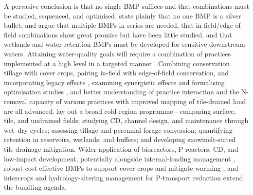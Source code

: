 A pervasive conclusion is that no single BMP suffices and that combinations must be studied, sequenced, and optimised. \textcite{Sunohara2016} state plainly that no one BMP is a silver bullet, and \textcite{Lenhart2016} argue that multiple BMPs in series are needed, that in-field/edge-of-field combinations show great promise but have been little studied, and that wetlands and water-retention BMPs must be developed for sensitive downstream waters. Attaining water-quality goals will require a combination of practices implemented at a high level in a targeted manner \parencite{Christianson2014}. Combining conservation tillage with cover crops, pairing in-field with edge-of-field conservation, and incorporating legacy effects \parencite{Makhtoumi2025}, examining synergistic effects and formalising optimisation studies \parencite{Kreig2019}, and better understanding of practice interaction and the N-removal capacity of various practices with improved mapping of tile-drained land \parencite{McLellan2015} are all advanced. \textcite{Baulch2019} lay out a broad cold-region programme---comparing surface, tile, and undrained fields; studying CD, channel design, and maintenance through wet--dry cycles; assessing tillage and perennial-forage conversion; quantifying retention in reservoirs, wetlands, and buffers; and developing snowmelt-suited tile-drainage mitigation. Wider application of bioreactors, P reactors, CD, and low-impact development, potentially alongside internal-loading management \parencite{Husk2024,Husk2017}, robust cost-effective BMPs to support cover crops and mitigate warming \parencite{Gupta2023}, and intercrops and hydrology-altering management for P-transport reduction \parencite{HernandezRamirez2011,GAYNOR1995b} extend the bundling agenda.


